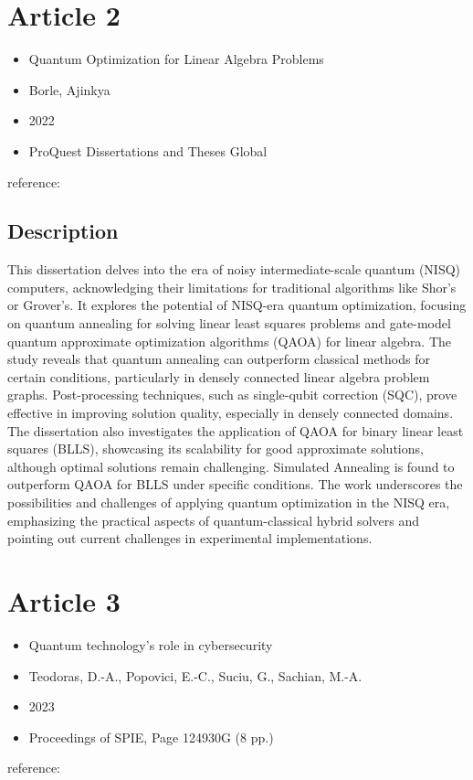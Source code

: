 \documentclass{article}
\begin{document}
\section{Article 2}
\begin{itemize}
    \item Quantum Optimization for Linear Algebra Problems
    \item Borle, Ajinkya
    \item 2022
    \item ProQuest Dissertations and Theses Global
\end{itemize}
reference: \cite{20230513513456}

\subsection{Description}
This dissertation delves into the era of noisy intermediate-scale quantum (NISQ) computers, acknowledging their limitations for traditional algorithms like Shor's or Grover's. It explores the potential of NISQ-era quantum optimization, focusing on quantum annealing for solving linear least squares problems and gate-model quantum approximate optimization algorithms (QAOA) for linear algebra. The study reveals that quantum annealing can outperform classical methods for certain conditions, particularly in densely connected linear algebra problem graphs. Post-processing techniques, such as single-qubit correction (SQC), prove effective in improving solution quality, especially in densely connected domains. The dissertation also investigates the application of QAOA for binary linear least squares (BLLS), showcasing its scalability for good approximate solutions, although optimal solutions remain challenging. Simulated Annealing is found to outperform QAOA for BLLS under specific conditions. The work underscores the possibilities and challenges of applying quantum optimization in the NISQ era, emphasizing the practical aspects of quantum-classical hybrid solvers and pointing out current challenges in experimental implementations.

\section{Article 3}
\begin{itemize}
    \item Quantum technology's role in cybersecurity
    \item Teodoras, D.-A., Popovici, E.-C., Suciu, G., Sachian, M.-A.
    \item 2023
    \item Proceedings of SPIE, Page 124930G (8 pp.)
\end{itemize}
reference: \cite{23251628}
\end{document}
